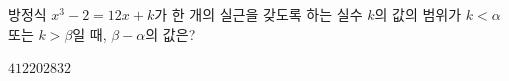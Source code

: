 방정식 $x^3-2=12x+k$가 한 개의 실근을 갖도록 하는 실수 $k$의 값의 범위가 $k<\alpha$ 또는 $k>\beta$일 때, $\beta-\alpha$의 값은?
\begin{choices32}{$4$}{$12$}{$20$}{$28$}{$32$}\end{choices32}
